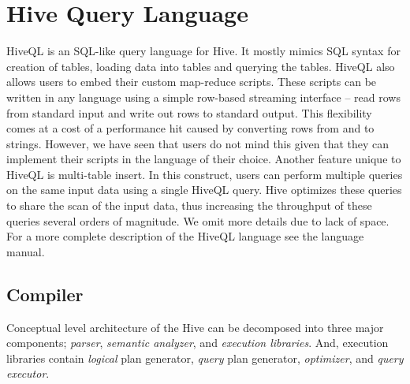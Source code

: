 \documentclass[twocolumn]{article}
\begin{document}
\section{Hive Query Language}
HiveQL is an SQL-like query language for Hive. It mostly mimics SQL syntax for creation of tables, loading data into tables and querying the tables. HiveQL also allows users to embed their custom map-reduce scripts. These scripts can be written in any language using a simple row-based streaming interface – read rows from standard input and write out rows to standard output. This flexibility comes at a cost of a performance hit caused by converting rows from and to strings. However, we have seen that users do not mind this given that they can implement their scripts in the language of their choice. Another feature unique to HiveQL is multi-table insert. In this construct, users can perform multiple queries on the same input data using a single HiveQL query. Hive optimizes these queries to share the scan of the input data, thus increasing the throughput of these queries several orders of magnitude. We omit more details due to lack of space. For a more complete description of the HiveQL language see the language manual.

\subsection{Compiler}
Conceptual level architecture of the Hive can be decomposed into three major components; \textit{parser}, \textit{semantic analyzer}, and \textit{execution libraries}. And, execution libraries contain \textit{logical} plan generator, \textit{query} plan generator, \textit{optimizer}, and \textit{query executor}.
\end{document}
